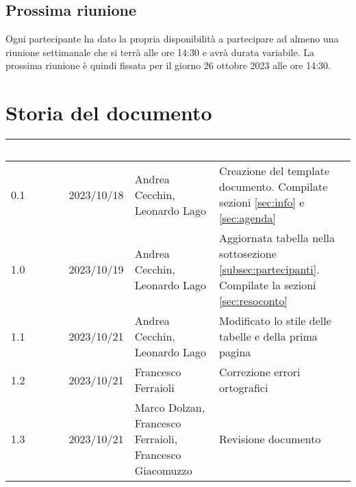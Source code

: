 \documentclass[12pt]{article}
\begin{document}
\subsection{Prossima riunione} \label{subsec:riunione}
Ogni partecipante ha dato la propria disponibilità a partecipare ad almeno una riunione settimanale che si terrà alle ore 14:30 e avrà durata variabile.  La prossima riunione è quindi fissata per il giorno 26 ottobre 2023 alle ore 14:30. 

\section{Storia del documento} \label{sec:storia}
\begingroup
\setlength{\tabcolsep}{10pt}
\renewcommand{\arraystretch}{1.5}
\begin{tabularx}{\textwidth}{| l | l | X | X |}
    \hline
    \rowcolor{headerrow} \textbf{\textcolor{white}{Versione}} & \textbf{\textcolor{white}{Data}} & \textbf{\textcolor{white}{Autori}} & \textbf{\textcolor{white}{Descrizione}} \\
    \hline
    0.1 & 2023/10/18 & Andrea Cecchin, Leonardo Lago  & Creazione del template documento. Compilate sezioni \ref{sec:info} e \ref{sec:agenda}\\
    \hline
    1.0 & 2023/10/19 & Andrea Cecchin, Leonardo Lago &  Aggiornata tabella nella sottosezione \ref{subsec:partecipanti}. Compilate la sezioni \ref{sec:resoconto}\\
    \hline
    1.1 & 2023/10/21 & Andrea Cecchin, Leonardo Lago & Modificato lo stile delle tabelle e della prima pagina\\
    \hline
    1.2 & 2023/10/21 & Francesco Ferraioli & Correzione errori ortografici\\
    \hline
    1.3 & 2023/10/21 & Marco Dolzan, Francesco Ferraioli, Francesco Giacomuzzo & Revisione documento\\
    \hline
\end{tabularx}
\endgroup
\end{document}

